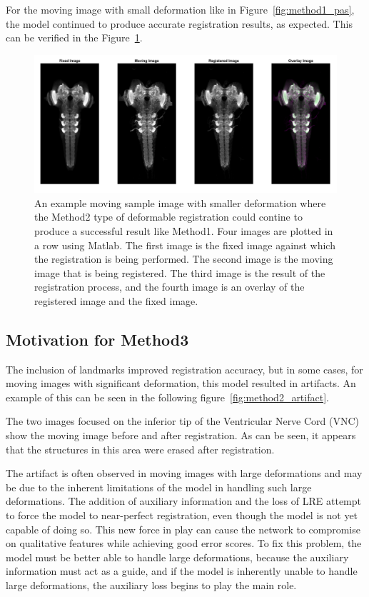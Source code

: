 \documentclass{report}
\begin{document}
	For the moving image with small deformation like in Figure~\ref{fig:method1_pas}, the model continued to produce accurate registration results, as expected. This can be verified in the Figure~\ref{fig:method2_pas}.
	
	\begin{figure}[h]
		\centering
		\includegraphics[width=0.9\columnwidth]{resources/chapter4/method2/np_brain7_scaled.tif.png}
		\caption{An example moving sample image with smaller deformation where the Method2 type of deformable registration could contine to produce a successful result like Method1. Four images are plotted in a row using Matlab. The first image is the fixed image against which the registration is being performed. The second image is the moving image that is being registered. The third image is the result of the registration process, and the fourth image is an overlay of the registered image and the fixed image.}
		\label{fig:method2_pas}
	\end{figure}
	
	\subsection{Motivation for Method3}
	The inclusion of landmarks improved registration accuracy, but in some cases, for moving images with significant deformation, this model resulted in artifacts. An example of this can be seen in the following figure~\ref{fig:method2_artifact}.
	
	The two images focused on the inferior tip of the Ventricular Nerve Cord (VNC) show the moving image before and after registration. As can be seen, it appears that the structures in this area were erased after registration.
	
	The artifact is often observed in moving images with large deformations and may be due to the inherent limitations of the model in handling such large deformations. The addition of auxiliary information and the loss of LRE attempt to force the model to near-perfect registration, even though the model is not yet capable of doing so. This new force in play can cause the network to compromise on qualitative features while achieving good error scores. To fix this problem, the model must be better able to handle large deformations, because the auxiliary information must act as a guide, and if the model is inherently unable to handle large deformations, the auxiliary loss begins to play the main role.
	
\end{document}

